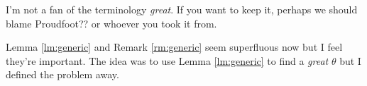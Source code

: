 \documentclass[12pt]{amsart}
\newcommand{\Wt}{\textup{Wt}}
\begin{document}
{\red I'm not a fan of the terminology {\em great}. If you want to keep it, perhaps we should blame Proudfoot?? or whoever you took it from.}


{\red Lemma \ref{lm:generic} and Remark \ref{rm:generic} seem superfluous now but I feel they're important. The idea was to use Lemma \ref{lm:generic} to find a {\em great} $\theta$ but I defined the problem away.}


\end{document}
